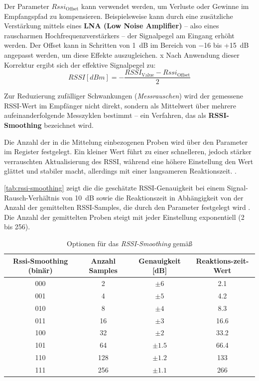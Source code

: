 	Der Parameter \(Rssi_{\text{Offset}}\)  kann verwendet werden, um Verluste oder Gewinne im Empfangspfad zu kompensieren. Beispielsweise kann durch eine zusätzliche Verstärkung mittels eines \textbf{LNA (Low Noise Amplifier)} – also eines rauscharmen Hochfrequenzverstärkers – der Signalpegel am Eingang erhöht werden. 
	Der Offset kann in Schritten von 1~dB im Bereich von −16 bis +15~dB angepasst werden, um diese Effekte auszugleichen. 
x	
	Nach Anwendung dieser Korrektur ergibt sich der effektive Signalpegel zu:
	\[
	RSSI[dBm] = -\frac{RSSI_{\text{Value}} - Rssi_{\text{Offset}}}{2}
	\]
	
	Zur Reduzierung zufälliger Schwankungen (\textit{Messrauschen}) wird der gemessene RSSI-Wert im Empfänger nicht direkt, sondern als Mittelwert über mehrere aufeinanderfolgende Messzyklen bestimmt – ein Verfahren, das als \textbf{RSSI-Smoothing} bezeichnet wird. 

	Die Anzahl der in die Mittelung einbezogenen Proben wird über den Parameter  im Register  festgelegt. Ein kleiner Wert führt zu einer schnelleren, jedoch stärker verrauschten Aktualisierung des RSSI, während eine höhere Einstellung den Wert glättet und stabiler macht, allerdings mit einer langsameren Reaktionszeit. \cite{Semtech:2015b}.
	
	\autoref{tab:rssi-smoothing} zeigt die die geschätzte RSSI-Genauigkeit bei einem Signal-Rausch-Verhältnis von 10~dB sowie die Reaktionszeit in Abhängigkeit von der Anzahl der gemittelten RSSI-Samples, die durch den Parameter  festgelegt wird \cite[Table~39]{Semtech:2015b}. Die Anzahl der gemittelten Proben steigt mit jeder Einstellung exponentiell (2 bis 256).
	
	\begin{table}[H]
		\centering
		\scriptsize
		\caption{Optionen für das \textit{RSSI-Smoothing} gemä{\ss} \cite[Table~39]{Semtech:2015b}}
		\label{tab:rssi-smoothing}
		\begin{tabular}{c c c c}
			\hline
			\textbf{Rssi-Smoothing (binär)} &
			\textbf{Anzahl Samples} &
			\textbf{Genauigkeit [dB]} &
			\textbf{Reaktions-zeit-Wert} \\ 
			\hline
			000 & 2   & \( \pm 6 \)   & 2.1  \\
			001 & 4   & \( \pm 5 \)   & 4.2  \\
			010 & 8   & \( \pm 4 \)   & 8.3  \\
			011 & 16  & \( \pm 3 \)   & 16.6 \\
			100 & 32  & \( \pm 2 \)   & 33.2 \\
			101 & 64  & \( \pm 1.5 \) & 66.4 \\
			110 & 128 & \( \pm 1.2 \) & 133  \\
			111 & 256 & \( \pm 1.1 \) & 266  \\
			\hline
		\end{tabular}
	\end{table}
	
